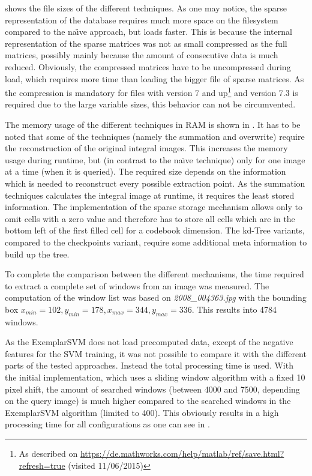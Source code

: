  shows the file sizes of the different techniques. As one may notice, the \MATLAB sparse representation of the database requires much more space on the filesystem compared to the na\"{\i}ve approach, but loads faster. This is because the internal representation of the sparse matrices was not as small compressed as the full matrices, possibly mainly because the amount of consecutive data is much reduced. Obviously, the compressed matrices have to be uncompressed during load, which requires more time than loading the bigger file of sparse matrices. As the compression is mandatory for \MATLAB files with version 7 and up\footnote{\label{footnote:matlab_files}As described on \url{https://de.mathworks.com/help/matlab/ref/save.html?refresh=true} (visited 11/06/2015)} and version 7.3 is required due to the large variable sizes, this behavior can not be circumvented.

The memory usage of the different techniques in \ac{RAM} is shown in . It has to be noted that some of the techniques (namely the summation and overwrite) require the reconstruction of the original integral images. This increases the memory usage during runtime, but (in contrast to the na\"{\i}ve technique) only for one image at a time (when it is queried). The required size depends on the information which is needed to reconstruct every possible extraction point. As the summation techniques calculates the integral image at runtime, it requires the least stored information. The implementation of the sparse storage mechanism allows only to omit cells with a zero value and therefore has to store all cells which are in the bottom left of the first filled cell for a codebook dimension. The kd-Tree variants, compared to the checkpoints variant, require some additional meta information to build up the tree.

To complete the comparison between the different mechanisms, the time required to extract a complete set of windows from an image was measured. The computation of the window list was based on \textit{2008\_004363.jpg} with the bounding box $x_{min} = 102, y_{min} = 178, x_{max} = 344, y_{max} = 336$. This results into 4784 windows. %

As the ExemplarSVM does not load precomputed data, except of the negative features for the \ac{SVM} training, it was not possible to compare it with the different parts of the tested approaches. Instead the total processing time is used.
With the initial implementation, which uses a sliding window algorithm with a fixed 10 pixel shift, the amount of searched windows (between 4000 and 7500, depending on the query image) is much higher compared to the searched windows in the ExemplarSVM algorithm (limited to 400). This obviously results in a high processing time for all configurations as one can see in .

